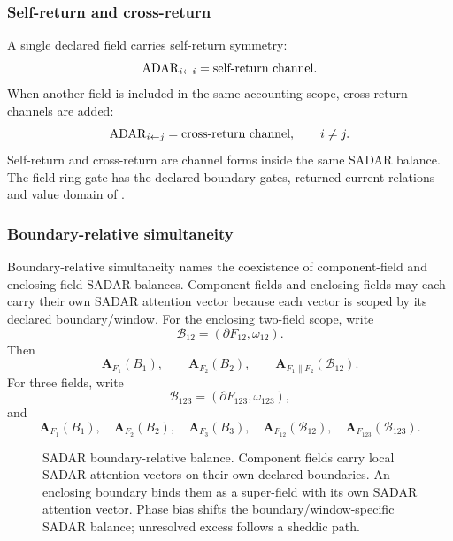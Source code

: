 \subsubsection{Self-return and cross-return}\label{subsec:self-cross-return}
A single declared field carries self-return symmetry:
\[
\mathrm{ADAR}_{i\leftarrow i}=\text{self-return channel}.
\]
When another field is included in the same accounting scope, cross-return channels are added:
\[
\mathrm{ADAR}_{i\leftarrow j}=\text{cross-return channel},\qquad i\ne j.
\]
Self-return and cross-return are channel forms inside the same SADAR balance. The field ring gate has the declared boundary gates, returned-current relations and value domain of .

\subsubsection{Boundary-relative simultaneity}\label{subsec:boundary-relative-simultaneity}
Boundary-relative simultaneity names the coexistence of component-field and enclosing-field SADAR balances. Component fields and enclosing fields may each carry their own SADAR attention vector because each vector is scoped by its declared boundary/window. For the enclosing two-field scope, write
\[
\mathcal{B}_{12}=(\partial F_{12},\omega_{12}).
\]
Then
\[
\mathbf A_{F_1}(B_1),
\qquad
\mathbf A_{F_2}(B_2),
\qquad
\mathbf A_{F_1\parallel F_2}(\mathcal{B}_{12}).
\]
For three fields, write
\[
\mathcal{B}_{123}=(\partial F_{123},\omega_{123}),
\]
and
\[
\mathbf A_{F_1}(B_1),\quad
\mathbf A_{F_2}(B_2),\quad
\mathbf A_{F_3}(B_3),\quad
\mathbf A_{F_{12}}(\mathcal{B}_{12}),\quad
\mathbf A_{F_{123}}(\mathcal{B}_{123}).
\]

\begin{figure}[H]
\centering
{}
\caption{SADAR boundary-relative balance. Component fields carry local SADAR attention vectors on their own declared boundaries. An enclosing boundary binds them as a super-field with its own SADAR attention vector. Phase bias shifts the boundary/window-specific SADAR balance; unresolved excess follows a sheddic path.}
\label{fig:sadar-boundary-relative-balance}
\end{figure}

